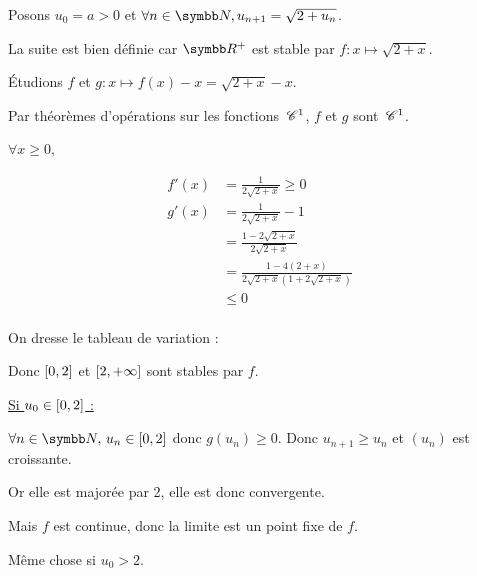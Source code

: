 \begin{exemple}
    Posons $u_0 = a > 0$ et $\forall n \in \N, u_{n + 1} = \sqrt{2 + u_n}$. 

    La suite est bien définie car $\R^+$ est stable par $f: x \mapsto \sqrt{2 + x}$. 

    Étudions $f$ et $g: x \mapsto f(x) - x = \sqrt{2 + x} - x$.

    Par théorèmes d'opérations sur les fonctions $\,\mathscr C^{1}$, $f$ et $g$ sont $\,\mathscr C^{1}$. 

    $\forall x  \geqslant 0,$

    \begin{align*}
        f'(x) & = \frac 1 {2\sqrt{2 + x}} \geqslant 0 \\
        g'(x) & = \frac 1 {2\sqrt{2 + x}} - 1 \\
        & = \frac{1 - 2 \sqrt{2 + x}}{2 \sqrt{2 + x}} \\
        & = \frac{1 - 4(2 + x)}{2 \sqrt{2 + x}\left(1 + 2\sqrt{2 + x}\right)} \\
        & \leqslant 0 \\
    \end{align*}

    On dresse le tableau de variation :
    \begin{center}
    \end{center}

    Donc $\left[0, 2\right]$ et $\left[2, +\infty\right]$ sont stables par $f$.

    \uline{Si $u_0 \in \left[0, 2\right]$ :}

    \avspace $\forall n \in \N, \, u_n \in \inter{0}{2}$ donc $g(u_n) \geqslant 0$. 
    Donc $u_{n + 1} \geqslant u_n$ et $(u_n)$ est croissante. 

    Or elle est majorée par 2, elle est donc convergente. 

    Mais $f$ est continue, donc la limite est un point fixe de $f$.

    Même chose si $u_0 > 2$. 
\end{exemple}


